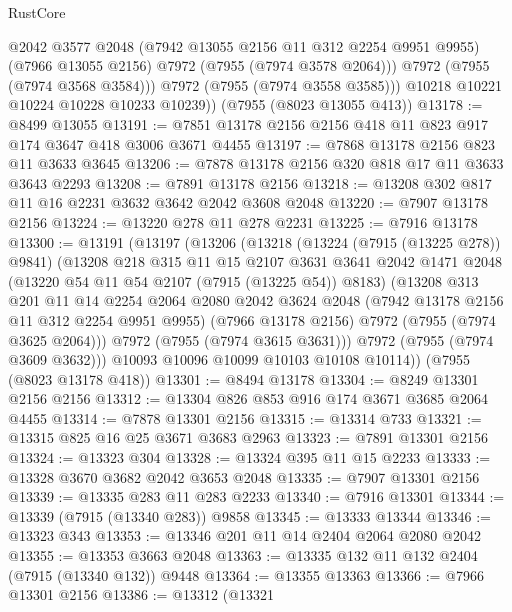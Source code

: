 \begin{lexlean}{RustCore}
\begin{coremodule}
              @2042
              @3577
              @2048
              (@7942 @13055 @2156 @11 @312 @2254 @9951 @9955)
              (@7966 @13055 @2156)
              @7972
              (@7955 (@7974 @3578 @2064)))
            @7972
            (@7955 (@7974 @3568 @3584)))
          @7972
          (@7955 (@7974 @3558 @3585)))
        @10218
        @10221
        @10224
        @10228
        @10233
        @10239))
    (@7955 (@8023 @13055 @413))
@13178 := @8499 @13055
@13191 := @7851 @13178 @2156 @2156 @418 @11 @823 @917 @174 @3647 @418 @3006 @3671 @4455
@13197 := @7868 @13178 @2156 @823 @11 @3633 @3645
@13206 := @7878 @13178 @2156 @320 @818 @17 @11 @3633 @3643 @2293
@13208 := @7891 @13178 @2156
@13218 := @13208 @302 @817 @11 @16 @2231 @3632 @3642 @2042 @3608 @2048
@13220 := @7907 @13178 @2156
@13224 := @13220 @278 @11 @278 @2231
@13225 := @7916 @13178
@13300 := @13191
    (@13197
      (@13206
        (@13218
          (@13224 (@7915 (@13225 @278)) @9841)
          (@13208
            @218
            @315
            @11
            @15
            @2107
            @3631
            @3641
            @2042
            @1471
            @2048
            (@13220 @54 @11 @54 @2107 (@7915 (@13225 @54)) @8183)
            (@13208
              @313
              @201
              @11
              @14
              @2254
              @2064
              @2080
              @2042
              @3624
              @2048
              (@7942 @13178 @2156 @11 @312 @2254 @9951 @9955)
              (@7966 @13178 @2156)
              @7972
              (@7955 (@7974 @3625 @2064)))
            @7972
            (@7955 (@7974 @3615 @3631)))
          @7972
          (@7955 (@7974 @3609 @3632)))
        @10093
        @10096
        @10099
        @10103
        @10108
        @10114))
    (@7955 (@8023 @13178 @418))
@13301 := @8494 @13178
@13304 := @8249 @13301 @2156 @2156
@13312 := @13304 @826 @853 @916 @174 @3671 @3685 @2064 @4455
@13314 := @7878 @13301 @2156
@13315 := @13314 @733
@13321 := @13315 @825 @16 @25 @3671 @3683 @2963
@13323 := @7891 @13301 @2156
@13324 := @13323 @304
@13328 := @13324 @395 @11 @15 @2233
@13333 := @13328 @3670 @3682 @2042 @3653 @2048
@13335 := @7907 @13301 @2156
@13339 := @13335 @283 @11 @283 @2233
@13340 := @7916 @13301
@13344 := @13339 (@7915 (@13340 @283)) @9858
@13345 := @13333 @13344
@13346 := @13323 @343
@13353 := @13346 @201 @11 @14 @2404 @2064 @2080 @2042
@13355 := @13353 @3663 @2048
@13363 := @13335 @132 @11 @132 @2404 (@7915 (@13340 @132)) @9448
@13364 := @13355 @13363
@13366 := @7966 @13301 @2156
@13386 := @13312
    (@13321

\end{coremodule}
\end{lexlean}
